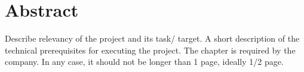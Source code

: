 \chapter*{Abstract}
Describe relevancy of the project and its task/ target. A short description of the technical prerequisites for executing the project. The chapter is required by the company. In any case, it should not be longer than 1 page, ideally 1/2 page.

\lipsum[1]